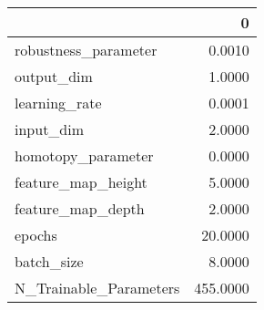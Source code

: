\begin{tabular}{lr}
\toprule
{} &         0 \\
\midrule
robustness\_parameter   &    0.0010 \\
output\_dim             &    1.0000 \\
learning\_rate          &    0.0001 \\
input\_dim              &    2.0000 \\
homotopy\_parameter     &    0.0000 \\
feature\_map\_height     &    5.0000 \\
feature\_map\_depth      &    2.0000 \\
epochs                 &   20.0000 \\
batch\_size             &    8.0000 \\
N\_Trainable\_Parameters &  455.0000 \\
\bottomrule
\end{tabular}
